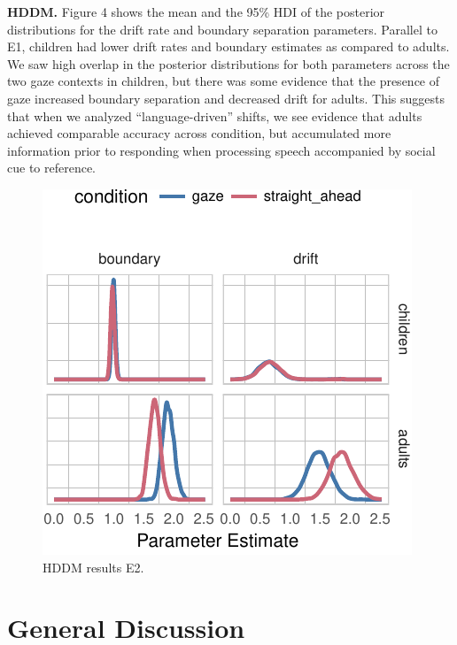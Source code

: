 \documentclass[10pt, letterpaper]{article}
\newenvironment{CodeChunk}{}{}
\begin{document}
\textbf{HDDM.} Figure 4 shows the mean and the 95\% HDI of the posterior
distributions for the drift rate and boundary separation parameters.
Parallel to E1, children had lower drift rates and boundary estimates as
compared to adults. We saw high overlap in the posterior distributions
for both parameters across the two gaze contexts in children, but there
was some evidence that the presence of gaze increased boundary
separation and decreased drift for adults. This suggests that when we
analyzed ``language-driven'' shifts, we see evidence that adults
achieved comparable accuracy across condition, but accumulated more
information prior to responding when processing speech accompanied by
social cue to reference.

\begin{CodeChunk}
\begin{figure}[t]

{\centering \includegraphics[width=0.85\linewidth]{figs/hddm_plot_gaze-1} 

}

\caption[HDDM results E2]{HDDM results E2.}\label{fig:hddm_plot_gaze}
\end{figure}
\end{CodeChunk}

\section{General Discussion}\label{general-discussion}
\end{document}
